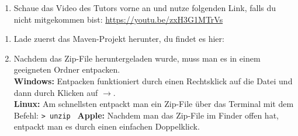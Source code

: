 
\label{ex1}

\begin{Infobox}
    \begin{enumerate}[label=\arabic*.]
        \item Schaue das Video des Tutors vorne an und nutze folgenden Link, falls du nicht mitgekommen bist:
        \color{blue}\url{https://youtu.be/zxH3G1MTrVs}
    \end{enumerate}
\end{Infobox}

\begin{Infobox}
    \begin{enumerate}[label=\arabic*.]
        \item Lade zuerst das Maven-Projekt \jvkpackage { } herunter, du findet es hier:
        \begin{center}
            \color{blue}\href{\jvkpackageurl}{\textit{\jvkpackageurl}}
        \end{center}

        \item Nachdem das Zip-File heruntergeladen wurde, muss man es in einem geeigneten Ordner entpacken.\\
        \textbf{Windows:} Entpacken funktioniert durch einen Rechtsklick auf die Datei und dann durch Klicken auf $\to$.\\
        \textbf{Linux:} Am schnellsten entpackt man ein Zip-File über das Terminal mit dem Befehl:
        \newline\hspace*{\fill}\texttt{\textgreater\ unzip \jvkpackage}\hspace*{\fill}\newline
        \textbf{Apple:} Nachdem man das Zip-File im Finder offen hat, entpackt man es durch einen einfachen Doppelklick.
    \end{enumerate}
\end{Infobox}


